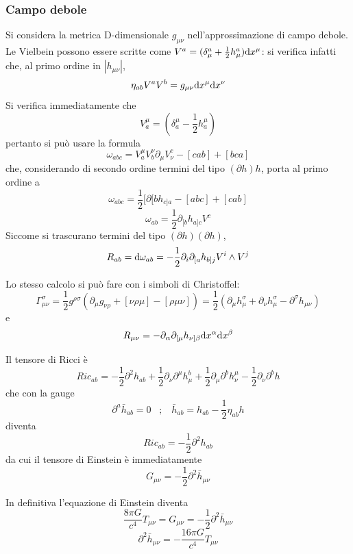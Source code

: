 \subsubsection{Campo debole}
Si considera la metrica D-dimensionale $g_{\mu\nu}$ nell'approssimazione di campo debole.
Le Vielbein possono essere scritte come \( V^a = (\delta^a_\mu + \frac{1}{2} h^a_\mu) \mathrm{d} x^\mu \): si verifica infatti che, al primo ordine in $|h_{\mu\nu}|$, 
\[ \eta_{ab} V^aV^b = g_{\mu\nu}\mathrm{d} x^\mu \mathrm{d} x^\nu \]
Si verifica immediatamente che 
\[ V^\mu_a = (\delta^\mu_a - \frac{1}{2} h^\mu_a) \]
pertanto si pu\`o usare la formula
\[ \omega_{abc} = V^\mu_a V^\nu_b \partial_\mu V^c_\nu - [cab] + [bca] \]
che, considerando di secondo ordine termini del tipo $(\partial h)h$,  \todo porta al primo ordine a 
\[ \omega_{abc} = \frac{1}{2} [ \partial{[b} h_{c]a} - [abc] + [cab] \]
\[ \omega_{ab} = \frac{1}{2} \partial_{[b} h_{a]c} V^c \]
Siccome si trascurano termini del tipo $(\partial h)(\partial h)$,
\[ R_{ab} = \mathrm{d} \omega_{ab} = -\frac{1}{2} \partial_i \partial_{[a} h_{b]j} V^i \wedge V^j \]

Lo stesso calcolo si pu\`o fare con i simboli di Christoffel:
\[ \Gamma ^\sigma_{\mu\nu} = \frac{1}{2} g^{\rho\sigma}(\partial_\mu g_{\nu\rho} + [\nu\rho\mu] - [\rho\mu\nu]) = \frac{1}{2}(\partial_\mu h^\sigma_\mu + \partial_\nu h^\sigma_\mu - \partial^\sigma h_{\mu\nu} ) \]
e
\[ R_{\mu\nu} = -\partial_{\alpha} \partial_{[\mu} h_{\nu]\beta} \mathrm{d} x^\alpha \mathrm{d} x^\beta \]

Il tensore di Ricci \`e
\[ Ric_{ab} = - \frac{1}{2} \partial^2  h_{ab} + \frac{1}{2} \partial_\nu \partial^\mu h^b_\mu 
              + \frac{1}{2} \partial_\mu \partial^b h^\mu_\nu - \frac{1}{2} \partial_\nu \partial^b h  \]
che con la gauge 
\[ \partial^a \bar{h}_{ab} = 0  \;\;\; ; \;\;\; \bar{h}_{ab} = h_{ab} - \frac{1}{2} \eta_{ab} h \]
diventa
\[ Ric_{ab} = - \frac{1}{2} \partial^2  h_{ab} \]
da cui il tensore di Einstein \`e immediatamente
\[ G_{\mu\nu} = -\frac{1}{2} \partial^2 \bar{h}_{\mu\nu} \]

\todo\todo

In definitiva l'equazione di Einstein diventa
\[ \frac{8\pi G}{c^4} T_{\mu\nu} = G_{\mu\nu} = -\frac{1}{2} \partial^2 \bar{h}_{\mu\nu} \]
\begin{equation} \label{eq:einst_lin}
	\partial^2 \bar{h}_{\mu\nu} = -\frac{16\pi G}{c^4} T_{\mu\nu} 
\end{equation}

